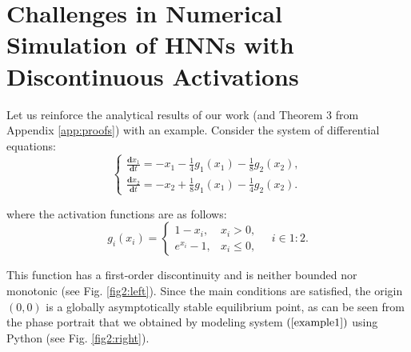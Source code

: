 \documentclass[journal]{IEEEtran}
\begin{document}
\section{Challenges in Numerical Simulation of HNNs with Discontinuous Activations}\label{sec:examples}


Let us reinforce the analytical results of our work 
(and Theorem 3 from Appendix \ref{app:proofs}) with an example.
Consider the system of differential equations:
\begin{equation}\label{example1}
\begin{cases}\frac{\mathbf{d}x_1}{\mathbf{d}{t}}=-x_1-\frac 1 4 g_1(x_1)-\frac 1 8 g_2(x_2),\\\frac{\mathbf{d}x_2}{\mathbf{d}{t}}=-x_2+\frac 1 8 g_1(x_1)-\frac 1 4 g_2(x_2).\end{cases}
\end{equation}

where the activation functions are as follows:
\begin{equation*}
    g_i(x_i) = \begin{cases}1-x_i,&x_i>0,\\ e^{x_i}-1, &x_i\leqslant0,\end{cases} \quad i\in 1:2.
\end{equation*}

This function has a first-order discontinuity and is neither bounded nor monotonic (see Fig. \ref{fig2:left}).
Since the main conditions are satisfied, the origin $(0,0)$
is a globally asymptotically stable equilibrium point,
as can be seen from the phase portrait that we obtained by modeling system $(\ref{example1})$ using Python (see Fig. \ref{fig2:right}).


\end{document}
